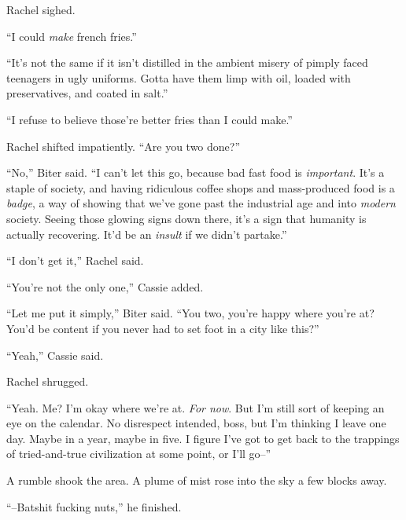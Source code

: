 Rachel sighed.



``I could \emph{make} french fries.''



``It's not the same if it isn't distilled in the ambient misery of pimply faced teenagers in ugly uniforms.  Gotta have them limp with oil, loaded with preservatives, and coated in salt.''



``I refuse to believe those're better fries than I could make.''



Rachel shifted impatiently.  ``Are you two done?''



``No,'' Biter said.  ``I can't let this go, because bad fast food is \emph{important}.  It's a staple of society, and having ridiculous coffee shops and mass-produced food is a \emph{badge}, a way of showing that we've gone past the industrial age and into \emph{modern} society.  Seeing those glowing signs down there, it's a sign that humanity is actually recovering.  It'd be an \emph{insult }if we didn't partake.''



``I don't get it,'' Rachel said.



``You're not the only one,'' Cassie added.



``Let me put it simply,'' Biter said.  ``You two, you're happy where you're at?  You'd be content if you never had to set foot in a city like this?''



``Yeah,'' Cassie said.



Rachel shrugged.



``Yeah.  Me?  I'm okay where we're at.  \emph{For now}.  But I'm still sort of keeping an eye on the calendar.  No disrespect intended, boss, but I'm thinking I leave one day.  Maybe in a year, maybe in five.  I figure I've got to get back to the trappings of tried-and-true civilization at some point, or I'll go--''



A rumble shook the area.  A plume of mist rose into the sky a few blocks away.



``--Batshit fucking nuts,'' he finished.



